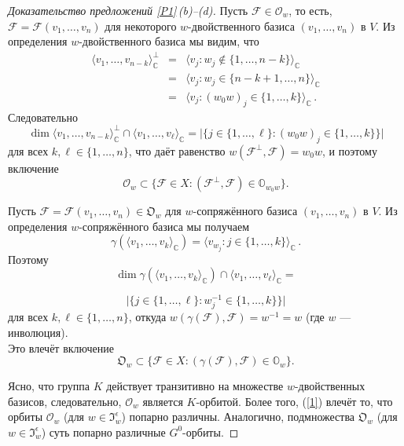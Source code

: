 \documentclass{amsart}
\theoremstyle{definition}
\begin{document}
\begin{proof}[Доказательство предложений \ref{P1}\,{\rm (b)}--{\rm (d)}]
Пусть $\mathcal{F}\in\mathcal{O}_w$, то есть,
$\mathcal{F}=\mathcal{F}(v_1,\ldots,v_n)$ для некоторого $w$-двойственного базиса
$(v_1,\ldots,v_n)$ в $V$. Из определения
$w$-двойственного базиса мы видим, что
\begin{eqnarray*}
\langle v_1,\ldots,v_{n-k}\rangle_\mathbb{C}^\perp & = & \langle v_j:w_j\notin\{1,\ldots,n-k\}\rangle_\mathbb{C} \\
 & = & \langle v_j:w_j\in\{n-k+1,\ldots,n\}\rangle_\mathbb{C} \\
 & = & \langle v_j:(w_0w)_j\in\{1,\ldots,k\}\rangle_\mathbb{C}\,.
\end{eqnarray*}
Следовательно
\[\dim\langle v_1,\ldots,v_{n-k}\rangle_\mathbb{C}^\perp\cap\langle v_1,\ldots,v_\ell\rangle_\mathbb{C}=\big|\big\{j\in\{1,\ldots,\ell\}:(w_0w)_j\in\{1,\ldots,k\}\big\}\big|\]
для всех $k,\ell\in\{1,\ldots,n\}$, что даёт равенство
$w(\mathcal{F}^\perp,\mathcal{F})=w_0w$, и поэтому включение
\begin{equation}
\label{1}
\mathcal{O}_w\subset\{\mathcal{F}\in
X:(\mathcal{F}^\perp,\mathcal{F})\in\mathbb{O}_{w_0w}\}.
\end{equation}

Пусть $\mathcal{F}=\mathcal{F}(v_1,\ldots,v_n)\in\mathfrak{O}_w$ для
$w$-сопряжённого базиса $(v_1,\ldots,v_n)$ в $V$. Из определения $w$-сопряжённого базиса мы получаем
\[\gamma(\langle v_1,\ldots,v_k\rangle_\mathbb{C})=\langle v_{w_j}:j\in\{1,\ldots,k\}\rangle_\mathbb{C}\,.\]
Поэтому
\[\dim\gamma(\langle v_1,\ldots,v_k\rangle_\mathbb{C})\cap\langle v_1,\ldots,v_\ell\rangle_\mathbb{C}=\]

\[\big|\big\{j\in\{1,\ldots,\ell\}:w^{-1}_j\in\{1,\ldots,k\}\big\}\big|\]
для всех $k,\ell\in\{1,\ldots,n\}$,
 откуда
$w(\gamma(\mathcal{F}),\mathcal{F})=w^{-1}=w$ (где $w$ --- инволюция).\\ Это влечёт включение
\begin{equation}
\label{2} \mathfrak{O}_w\subset\{\mathcal{F}\in
X:(\gamma(\mathcal{F}),\mathcal{F})\in\mathbb{O}_{w}\}.
\end{equation}

Ясно, что группа $K$ действует транзитивно на множестве
$w$-двойственных базисов, следовательно, $\mathcal{O}_w$ является  $K$-орбитой. Более того,
(\ref{1}) влечёт то, что орбиты $\mathcal{O}_w$ (для
$w\in\mathfrak{I}_w^\epsilon$) попарно различны. Аналогично, подмножества $\mathfrak{O}_w$ (для $w\in\mathfrak{I}_w^\epsilon$) суть попарно различные $G^0$-орбиты.


\end{proof}
\end{document}
